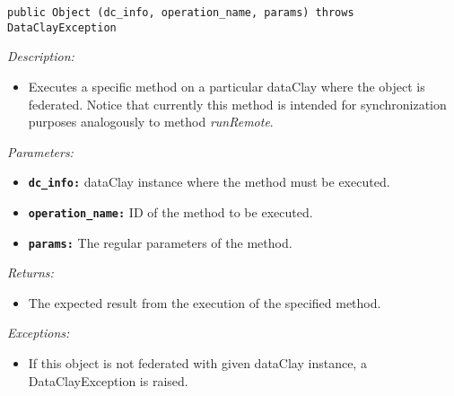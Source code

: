 \begin{dBox}
\texttt{public Object (dc\_info, \newline operation\_name, params) throws DataClayException}
\LINE

{\it Description:}

\begin{itemize}
  \item Executes a specific method on a particular dataClay where the object is federated. Notice that currently this method is intended for synchronization purposes analogously to method \textit{runRemote}.
\end{itemize}

{\it Parameters:}

\begin{itemize}
  \item \texttt{\bfseries dc\_info:} dataClay instance where the method must be executed.
  \item \texttt{\bfseries operation\_name:} ID of the method to be executed.
  \item \texttt{\bfseries params:} The regular parameters of the method.
\end{itemize}
 
{\it Returns:}

\begin{itemize}
  \item The expected result from the execution of the specified method.
\end{itemize}

{\it Exceptions:}

\begin{itemize}
  \item If this object is not federated with given dataClay instance, a DataClayException is raised.
\end{itemize}
\end{dBox}


